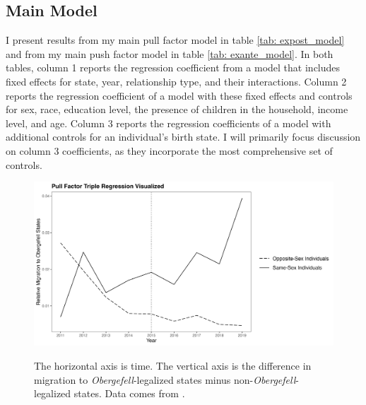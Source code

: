 \documentclass[12pt,letterpaper]{article}
\begin{document}
\FloatBarrier
\subsection{Main Model} %
I present results from my main pull factor model in table \ref{tab: expost_model} and from my main push factor model in table \ref{tab: exante_model}. In both tables, column 1 reports the regression coefficient from a model that includes fixed effects for state, year, relationship type, and their interactions. Column 2 reports the regression coefficient of a model with these fixed effects and controls for sex, race, education level, the presence of children in the household, income level, and age. Column 3 reports the regression coefficients of a model with additional controls for an individual’s birth state. I will primarily focus discussion on column 3 coefficients, as they incorporate the most comprehensive set of controls.

\begin{figure}[htbp]
    \centering
    \caption{}
    \label{fig: post_diffs}
    \includegraphics[width=0.75\linewidth]{outputs/summary_stats/post_diffs.png}

    \vspace{0.5em}
    \begin{minipage}{0.75\linewidth}
        \footnotesize The horizontal axis is time. The vertical axis is the difference in migration to \textit{Obergefell}-legalized states minus non-\textit{Obergefell}-legalized states. Data comes from \citet{28}.
    \end{minipage}
\end{figure}
\end{document}
